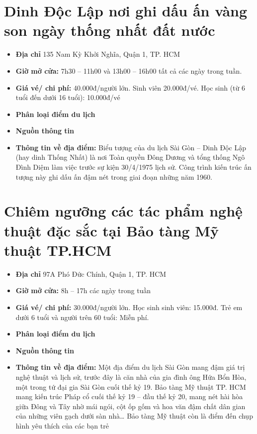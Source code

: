 \documentclass{article}
\begin{document}
\section{Dinh Độc Lập nơi ghi dấu ấn vàng son ngày thống nhất đất nước}
\begin{itemize}
    \item{\textbf{Địa chỉ}} 135 Nam Kỳ Khởi Nghĩa, Quận 1, TP. HCM
    \item{\textbf{Giờ mở cửa:}} 7h30 – 11h00 và 13h00 – 16h00 tất cả các ngày trong tuần.
    \item{\textbf{Giá vé/ chi phí:}} 40.000đ/người lớn. Sinh viên 20.000đ/vé. Học sinh (từ 6 tuổi đến dưới 16 tuổi): 10.000đ/vé
    \item{\textbf{Phân loại điểm du lịch} }
    \item{\textbf{Nguồn thông tin}}
    \item{\textbf{Thông tin về địa điểm:}} Biểu tượng của du lịch Sài Gòn – Dinh Độc Lập (hay dinh Thống Nhất) là nơi Toàn quyền Đông Dương và tổng thống Ngô Đình Diệm làm việc trước sự kiện 30/4/1975 lịch sử. Công trình kiến trúc ấn tượng này ghi dấu ấn đậm nét trong giai đoạn những năm 1960.
\end{itemize}

\section{Chiêm ngưỡng các tác phẩm nghệ thuật đặc sắc tại Bảo tàng Mỹ thuật TP.HCM}
\begin{itemize}
    \item{\textbf{Địa chỉ}} 97A Phó Đức Chính, Quận 1, TP. HCM
    \item{\textbf{Giờ mở cửa:}} 8h – 17h các ngày trong tuần
    \item{\textbf{Giá vé/ chi phí:}} 30.000đ/người lớn. Học sinh sinh viên: 15.000đ. Trẻ em dưới 6 tuổi và người trên 60 tuổi: Miễn phí.
    \item{\textbf{Phân loại điểm du lịch} }
    \item{\textbf{Nguồn thông tin}}
    \item{\textbf{Thông tin về địa điểm:}} Một địa điểm du lịch Sài Gòn mang đậm giá trị nghệ thuật và lịch sử, trước đây là căn nhà của gia đình ông Hứa Bổn Hòa, một trong tứ đại gia Sài Gòn cuối thế kỷ 19. Bảo tàng Mỹ thuật TP. HCM mang kiến trúc Pháp cổ cuối thế kỷ 19 – đầu thế kỷ 20, mang nét hài hòa giữa Đông và Tây nhờ mái ngói, cột ốp gốm và hoa văn đậm chất dân gian của những viên gạch dưới sàn nhà… Bảo tàng Mỹ thuật còn là điểm đến chụp hình yêu thích của các bạn trẻ
\end{itemize}
\end{document}
